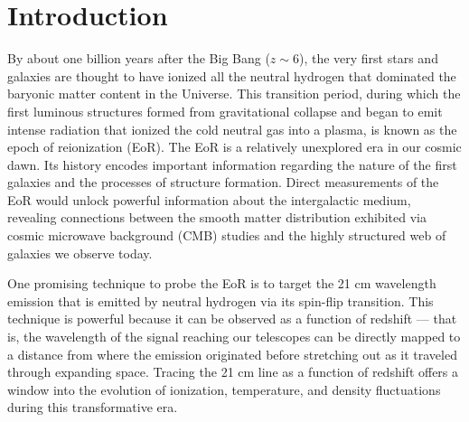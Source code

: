 \documentclass[preprint2,numberedappendix,tighten]{aastex6}  %
\begin{document}
\section{Introduction}
\label{sec:Intro}

By about one billion years after the Big Bang ($z \sim 6$), the very first stars and galaxies are thought to have ionized all the neutral hydrogen that dominated the baryonic matter content in the Universe. This transition period, during which the first luminous structures formed from gravitational collapse and began to emit intense radiation that ionized the cold neutral gas into a plasma, is known as the epoch of reionization (EoR). The EoR is a relatively unexplored era in our cosmic dawn. Its history encodes important information regarding the nature of the first galaxies and the processes of structure formation. Direct measurements of the EoR would unlock powerful information about the intergalactic medium, revealing connections between the smooth matter distribution exhibited via cosmic microwave background (CMB) studies and the highly structured web of galaxies we observe today.

One promising technique to probe the EoR is to target the 21 cm wavelength emission that is emitted by neutral hydrogen via its spin-flip transition. This technique is powerful because it can be observed as a function of redshift --- that is, the wavelength of the signal reaching our telescopes can be directly mapped to a distance from where the emission originated before stretching out as it traveled through expanding space. Tracing the 21 cm line as a function of redshift offers a window into the evolution of ionization, temperature, and density fluctuations during this transformative era.
\end{document}
